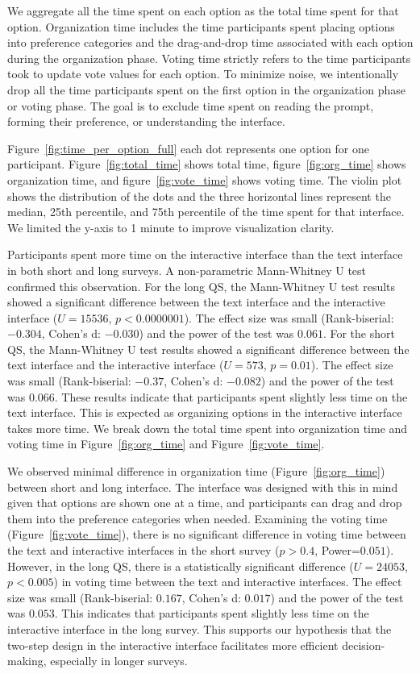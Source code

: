 We aggregate all the time spent on each option as the total time spent for that option. Organization time includes the time participants spent placing options into preference categories and the drag-and-drop time associated with each option during the organization phase. Voting time strictly refers to the time participants took to update vote values for each option. To minimize noise, we intentionally drop all the time participants spent on the first option in the organization phase or voting phase. The goal is to exclude time spent on reading the prompt, forming their preference, or understanding the interface.

Figure~\ref{fig:time_per_option_full} each dot represents one option for one participant. Figure~\ref{fig:total_time} shows total time, figure~\ref{fig:org_time} shows organization time, and figure~\ref{fig:vote_time} shows voting time. The violin plot shows the distribution of the dots and the three horizontal lines represent the median, 25th percentile, and 75th percentile of the time spent for that interface. We limited the y-axis to 1 minute to improve visualization clarity.

Participants spent more time on the interactive interface than the text interface in both short and long surveys. A non-parametric Mann-Whitney U test confirmed this observation. For the long QS, the Mann-Whitney U test results showed a significant difference between the text interface and the interactive interface ($U=15536$, $p<0.0000001$). The effect size was small (Rank-biserial: $-0.304$, Cohen's d: $-0.030$) and the power of the test was $0.061$. For the short QS, the Mann-Whitney U test results showed a significant difference between the text interface and the interactive interface ($U=573$, $p=0.01$). The effect size was small (Rank-biserial: $-0.37$, Cohen's d: $-0.082$) and the power of the test was $0.066$. These results indicate that participants spent slightly less time on the text interface. This is expected as organizing options in the interactive interface takes more time. We break down the total time spent into organization time and voting time in Figure~\ref{fig:org_time} and Figure~\ref{fig:vote_time}.

We observed minimal difference in organization time (Figure~\ref{fig:org_time}) between short and long interface. The interface was designed with this in mind given that options are shown one at a time, and participants can drag and drop them into the preference categories when needed. Examining the voting time (Figure~\ref{fig:vote_time}), there is no significant difference in voting time between the text and interactive interfaces in the short survey ($p>0.4$, Power=$0.051$). However, in the long QS, there is a statistically significant difference ($U=24053$, $p<0.005$) in voting time between the text and interactive interfaces. The effect size was small (Rank-biserial: $0.167$, Cohen's d: $0.017$) and the power of the test was $0.053$. This indicates that participants spent slightly less time on the interactive interface in the long survey. This supports our hypothesis that the two-step design in the interactive interface facilitates more efficient decision-making, especially in longer surveys.


